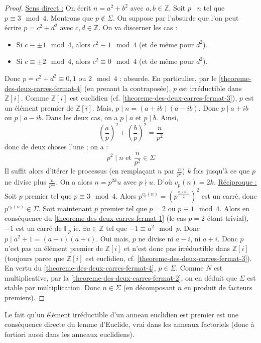   \begin{proof}
    \uline{Sens direct :} On écrit $n = a^2 + b^2$ avec $a, b \in \mathbb{Z}$. Soit $p \mid n$ tel que $p \equiv 3 \mod 4$. Montrons que $p \notin \Sigma$. On suppose par l'absurde que l'on peut écrire $p = c^2 + d^2$ avec $c, d \in \mathbb{Z}$. On va discerner les cas :
    \begin{itemize}
      \item Si $c \equiv \pm 1 \mod 4$, alors $c^2 \equiv 1 \mod 4$ (et de même pour $d^2$).
      \item Si $c \equiv \pm 2 \mod 4$, alors $c^2 \equiv 0 \mod 4$ (et de même pour $d^2$).
    \end{itemize}
    Donc $p = c^2 + d^2 \equiv 0, 1 \text{ ou } 2 \mod 4$ : absurde. En particulier, par le \cref{theoreme-des-deux-carres-fermat-4} (en prenant la contraposée), $p$ est irréductible dans $\mathbb{Z}[i]$. Comme $\mathbb{Z}[i]$ est euclidien (cf. \cref{theoreme-des-deux-carres-fermat-3}), $p$ est un élément premier de $\mathbb{Z}[i]$. Mais, $p \mid n = (a+ib)(a-ib)$. Donc $p \mid a+ib$ ou $p \mid a-ib$.
    Dans les deux cas, on a $p \mid a$ et $p \mid b$. Ainsi,
    \[ \left( \frac{a}{p} \right)^2 + \left( \frac{b}{p} \right)^2 = \frac{n}{p^2} \]
    donc de deux choses l'une ; on a :
    \[ p^2 \mid n \text{ et } \frac{n}{p^2} \in \Sigma \]
    Il suffit alors d'itérer le processus (en remplaçant $n$ par $\frac{n}{p^2}$) $k$ fois jusqu'à ce que $p$ ne divise plus $\frac{n}{p^{2k}}$. On a alors $n = p^{2k} u$ avec $p \nmid u$. D'où $v_p(n) = 2k$.
    \newpar
    \uline{Réciproque :} Soit $p$ premier tel que $p \equiv 3 \mod 4$. Alors $p^{v_p(n)} = \left( p^{\frac{v_p(n)}{2}} \right)^2$ est un carré, donc $p^{v_p(n)} \in \Sigma$.
    \newpar
    Soit maintenant $p$ premier tel que $p = 2$ ou $p \equiv 1  \mod 4$. Alors en conséquence du \cref{theoreme-des-deux-carres-fermat-1} (le cas $p = 2$ étant trivial), $-1$ est un carré de $\mathbb{F}_p$ ie. $\exists a \in \mathbb{Z}$ tel que $-1 \equiv a^2 \mod p$. Donc $p \mid a^2 + 1 = (a-i)(a+i)$. Oui mais, $p$ ne divise ni $a-i$, ni $a+i$. Donc $p$ n'est pas un élément premier de $\mathbb{Z}[i]$ et n'est donc pas irréductible dans $\mathbb{Z}[i]$ (toujours parce que $\mathbb{Z}[i]$ est euclidien, cf. \cref{theoreme-des-deux-carres-fermat-3}). En vertu du \cref{theoreme-des-deux-carres-fermat-4}, $p \in \Sigma$.
    \newpar
    Comme $N$ est multiplicative, par la \cref{theoreme-des-deux-carres-fermat-2}, on en déduit que $\Sigma$ est stable par multiplication. Donc $n \in \Sigma$ (en décomposant $n$ en produit de facteurs premiers).
  \end{proof}


  \begin{remark}
    Le fait qu'un élément irréductible d'un anneau euclidien est premier est une conséquence directe du lemme d'Euclide, vrai dans les anneaux factoriels (donc à fortiori aussi dans les anneaux euclidiens).
  \end{remark}

